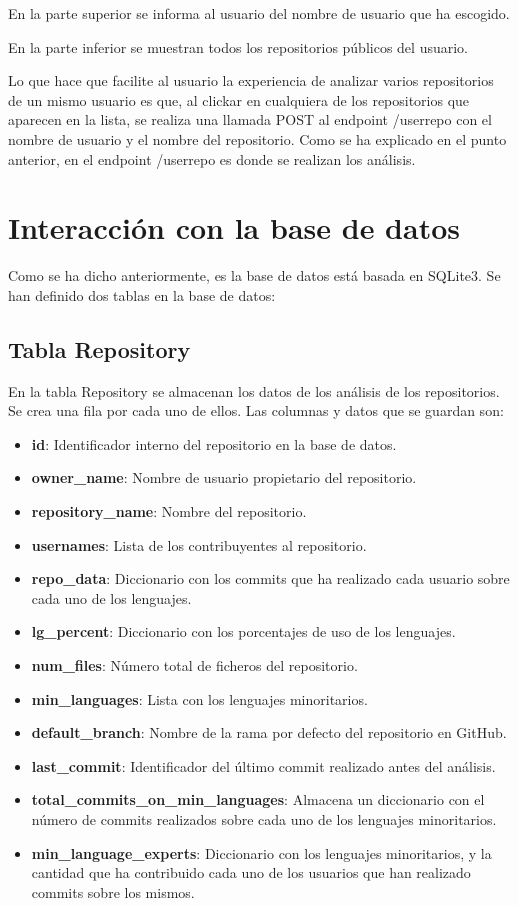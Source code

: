 \documentclass[a4paper, 12pt]{book}
\begin{document}
En la parte superior se informa al usuario del nombre de usuario que ha escogido.

En la parte inferior se muestran todos los repositorios públicos del usuario.

Lo que hace que facilite al usuario la experiencia de analizar varios repositorios de un mismo usuario es que, al clickar en cualquiera de los repositorios que aparecen en la lista, se realiza una llamada POST al endpoint /userrepo con el nombre de usuario y el nombre del repositorio. Como se ha explicado en el punto anterior, en el endpoint /userrepo es donde se realizan los análisis.

\section{Interacción con la base de datos}
\label{sec:Interacción con la base de datos}

Como se ha dicho anteriormente, es la base de datos está basada en SQLite3. Se han definido dos tablas en la base de datos:

\subsection{Tabla Repository}
\label{subsec:Tabla Repository}

En la tabla Repository se almacenan los datos de los análisis de los repositorios. Se crea una fila por cada uno de ellos. Las columnas y datos que se guardan son:
\begin{itemize}
  \item \textbf{id}: Identificador interno del repositorio en la base de datos.
  \item \textbf{owner\_name}: Nombre de usuario propietario del repositorio.
  \item \textbf{repository\_name}: Nombre del repositorio.
  \item \textbf{usernames}: Lista de los contribuyentes al repositorio.
  \item \textbf{repo\_data}: Diccionario con los commits que ha realizado cada usuario sobre cada uno de los lenguajes.
  \item \textbf{lg\_percent}: Diccionario con los porcentajes de uso de los lenguajes.
  \item \textbf{num\_files}: Número total de ficheros del repositorio.
  \item \textbf{min\_languages}: Lista con los lenguajes minoritarios.
  \item \textbf{default\_branch}: Nombre de la rama por defecto del repositorio en GitHub.
  \item \textbf{last\_commit}: Identificador del último commit realizado antes del análisis.
  \item \textbf{total\_commits\_on\_min\_languages}: Almacena un diccionario con el número de commits realizados sobre cada uno de los lenguajes minoritarios.
  \item \textbf{min\_language\_experts}: Diccionario con los lenguajes minoritarios, y la cantidad que ha contribuido cada uno de los usuarios que han realizado commits sobre los mismos.
\end{itemize}
\end{document}
